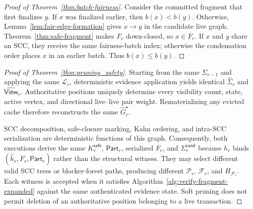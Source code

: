 \begin{proof}[Proof of Theorem~\ref{thm:batch-fairness}]
Consider the committed fragment that first finalizes $y$.  If $x$ was
finalized earlier, then $b(x)<b(y)$.  Otherwise,
Lemma~\ref{lem:fair-edge-formation} gives $x\to y$ in the candidate live
graph.  Theorem~\ref{thm:safe-fragment} makes $F_r$ down-closed, so
$x\in F_r$.  If $x$ and $y$ share an SCC, they receive the same fairness-batch
index; otherwise the condensation order places $x$ in an earlier batch.
Thus $b(x)\le b(y)$.
\end{proof}

\begin{proof}[Proof of Theorem~\ref{thm:pruning_safety}]
Starting from the same $\Sigma_{r-1}$ and applying the same $\mathcal L_r$,
deterministic evidence application yields identical $\widehat\Sigma_r$ and
$\widehat{\mathsf{View}}_r$.  Authoritative positions uniquely determine every
visibility count, state, active vertex, and directional live--live pair
weight.  Rematerializing any evicted cache therefore reconstructs the same
$\widehat G_r^\star$.

SCC decomposition, safe-closure marking, Kahn ordering, and intra-SCC
serialization are deterministic functions of this graph.  Consequently, both
executions derive the same $K_r^{\mathsf{safe}}$, $\mathsf{Part}_r$, serialized
$F_r$, and $\Sigma_r^{\mathsf{cand}}$ because $h_r$ binds
$(\widehat h_r,F_r,\mathsf{Part}_r)$ rather than the structural witness.  They
may select different valid SCC trees or blocker-forest paths, producing different $\mathcal P_r$,
$\mathcal F_r$, and $H_{\mathcal F_r}$.  Each witness is accepted when it
satisfies Algorithm~\ref{alg:verify-fragment-expanded} against the same
authenticated evidence state.  Soft pruning does not permit deletion of an
authoritative position belonging to a live transaction.
\end{proof}

